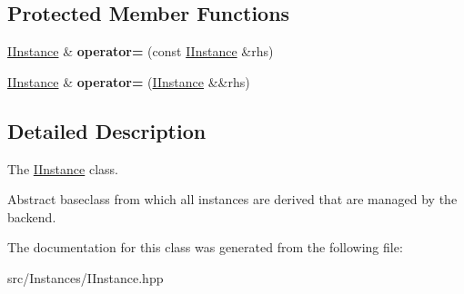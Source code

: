 \subsection*{Protected Member Functions}
\begin{DoxyCompactItemize}
\item 
\hypertarget{classInstances_1_1IInstance_ae508b083261f920a73cf1e72b3e39b60}{\hyperlink{classInstances_1_1IInstance}{I\+Instance} \& {\bfseries operator=} (const \hyperlink{classInstances_1_1IInstance}{I\+Instance} \&rhs)}\label{classInstances_1_1IInstance_ae508b083261f920a73cf1e72b3e39b60}

\item 
\hypertarget{classInstances_1_1IInstance_ae8adfd07ed05a7d1b49d364dd2bd3259}{\hyperlink{classInstances_1_1IInstance}{I\+Instance} \& {\bfseries operator=} (\hyperlink{classInstances_1_1IInstance}{I\+Instance} \&\&rhs)}\label{classInstances_1_1IInstance_ae8adfd07ed05a7d1b49d364dd2bd3259}

\end{DoxyCompactItemize}


\subsection{Detailed Description}
The \hyperlink{classInstances_1_1IInstance}{I\+Instance} class. 

Abstract baseclass from which all instances are derived that are managed by the backend. 

The documentation for this class was generated from the following file\+:\begin{DoxyCompactItemize}
\item 
src/\+Instances/I\+Instance.\+hpp\end{DoxyCompactItemize}
